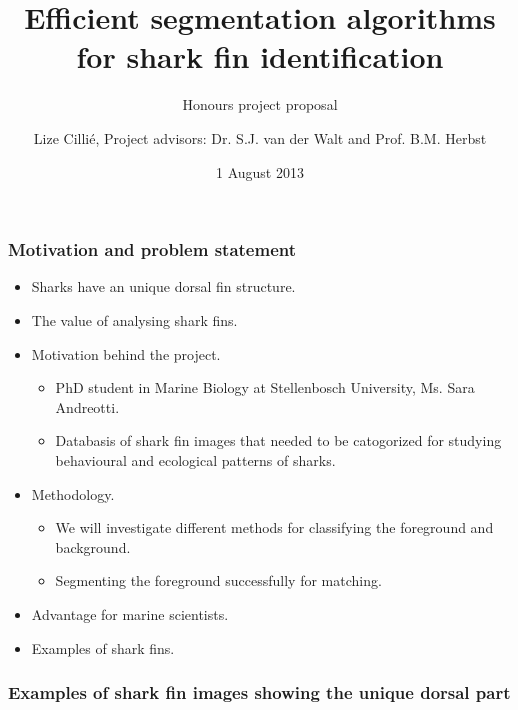 \documentclass{beamer}
\title{Efficient segmentation algorithms for shark fin identification}
\subtitle{Honours project proposal}
\author{Lize Cilli\'{e}, Project advisors: Dr. S.J. van der Walt and Prof. B.M.
Herbst}
\date{1 August 2013}
\institute{Department of Applied Mathematics, Stellenbosch University}
\newcommand{\myitem}{\item[$-$]}
\begin{document}
\maketitle


\begin{frame}
\frametitle{Motivation and problem statement}
\begin{itemize}
\item Sharks have an unique dorsal fin structure.
\item The value of analysing shark fins.
\item Motivation behind the project.
\begin{itemize}
 \myitem PhD student in Marine Biology at Stellenbosch University, Ms. Sara
Andreotti.
 \myitem Databasis of shark fin images that needed to be catogorized for studying
behavioural and ecological patterns of sharks.
\end{itemize}
\item Methodology.
\begin{itemize}
 \myitem We will investigate different methods for classifying the foreground and
background.
 \myitem Segmenting the foreground successfully for matching. 
\end{itemize}
\item Advantage for marine scientists.
\item Examples of shark fins.
\end{itemize}
\end{frame}


\begin{frame}
\frametitle{Examples of shark fin images showing the unique dorsal part}
\begin{figure}
\centering
\mbox{ \quad
{}}
\end{figure}
\begin{figure}
\centering
\mbox{ \quad
{}}
\end{figure}
\end{frame}
\end{document}
